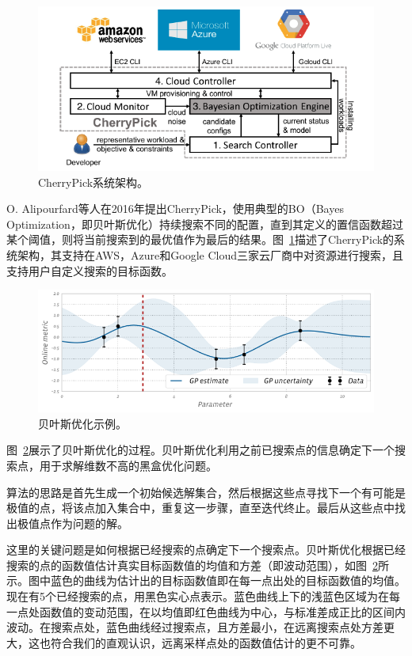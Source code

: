 \begin{figure}[h]
    \centerline{\includegraphics[width=\textwidth]{figures/cherrypick-arch.png}}
    \caption{CherryPick系统架构。}
    \label{cherrypick_arch}
\end{figure}

O. Alipourfard等人在2016年提出CherryPick\parencite{alipourfard2017cherrypick}，使用典型的BO（Bayes Optimization，即贝叶斯优化）持续搜索不同的配置，直到其定义的置信函数超过某个阈值，则将当前搜索到的最优值作为最后的结果。图~\ref{cherrypick_arch}描述了CherryPick的系统架构，其支持在AWS，Azure和Google Cloud三家云厂商中对资源进行搜索，且支持用户自定义搜索的目标函数。

\begin{figure}[h]
    \centerline{\includegraphics[width=\textwidth]{figures/bo_example.png}}
    \caption{贝叶斯优化示例。}
    \label{bo_example}
\end{figure}

图~\ref{bo_example}展示了贝叶斯优化的过程。贝叶斯优化利用之前已搜索点的信息确定下一个搜索点，用于求解维数不高的黑盒优化问题。

算法的思路是首先生成一个初始候选解集合，然后根据这些点寻找下一个有可能是极值的点，将该点加入集合中，重复这一步骤，直至迭代终止。最后从这些点中找出极值点作为问题的解。

这里的关键问题是如何根据已经搜索的点确定下一个搜索点。贝叶斯优化根据已经搜索的点的函数值估计真实目标函数值的均值和方差（即波动范围），如图~\ref{bo_example}所示。图中蓝色的曲线为估计出的目标函数值即在每一点出处的目标函数值的均值。现在有5个已经搜索的点，用黑色实心点表示。蓝色曲线上下的浅蓝色区域为在每一点处函数值的变动范围，在以均值即红色曲线为中心，与标准差成正比的区间内波动。在搜索点处，蓝色曲线经过搜索点，且方差最小，在远离搜索点处方差更大，这也符合我们的直观认识，远离采样点处的函数值估计的更不可靠。

